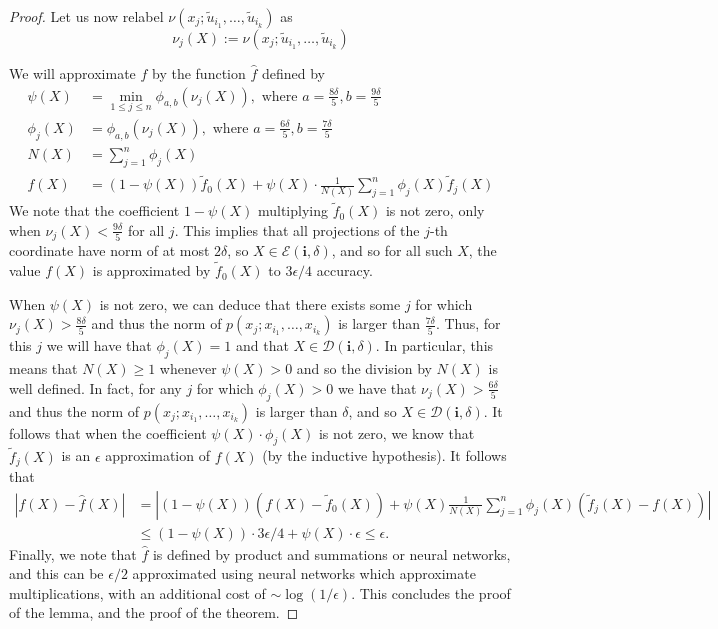 \documentclass[twoside,11pt]{article}
\begin{document}
\begin{proof}
Let us now relabel $\nu(x_j;\tilde u_{i_1},\ldots,\tilde u_{i_k}) $ as 
$$\nu_j(X):=\nu(x_j;\tilde u_{i_1},\ldots,\tilde u_{i_k}) $$

We will approximate $f$ by the function $\hat f$ defined by 
\begin{align*}
\psi(X)&=\min_{1\leq j \leq n} \phi_{a,b}\left(\nu_j(X)\right) , \text{ where } a=\frac{8\delta}{5}, b=\frac{9\delta}{5} \\
\phi_j(X)&=\phi_{a,b}\left( \nu_j(X)\right) , \text{ where } a=\frac{6\delta}{5}, b=\frac{7\delta}{5} \\
N(X)&=\sum_{j=1}^n  \phi_j(X)\\
\hat f(X)&=(1-\psi(X))\tilde{f}_0(X)+\psi(X)\cdot \frac{1}{N(X)} \sum_{j=1}^n  \phi_j(X)\tilde{f}_j(X)
\end{align*}
We note that the coefficient $1-\psi(X) $ multiplying $\tilde f_0(X)$ is not zero, only when $\nu_j(X)<\frac{9\delta}{5} $ for all $j$.  This implies that all projections of the $j$-th coordinate have norm of at most $2\delta$, so $X\in \mathcal{E}(\mathbf{i},\delta)$, and so for all such $X$, the value $f(X)$ is approximated by $\tilde f_0(X)$ to $3\epsilon/4$ accuracy. 

When $\psi(X)$ is not zero, we can deduce that there exists some $j$ for which $\nu_j(X)>\frac{8\delta}{5}$ and thus the norm of  $p(x_j;x_{i_1},\ldots,x_{i_k})$ is larger than $\frac{7\delta}{5} $. Thus, for this $j$ we will have that $\phi_j(X)=1 $ and that $X\in \mathcal{D}(\mathbf{i},\delta) $. In particular, this means that $N(X)\geq 1 $ whenever $\psi(X)>0$ and so the division by $N(X)$ is well defined. In fact, for any $j$ for which $\phi_j(X)>0$ we have that $\nu_j(X)>\frac{6\delta}{5}$ and thus the norm of  $p(x_j;x_{i_1},\ldots,x_{i_k})$ is larger than $\delta $, and so $X\in \mathcal{D}(\mathbf{i},\delta) $. It follows that when the coefficient $\psi(X)\cdot \phi_j(X) $ is not zero, we know that  $\tilde f_j(X)$ is an $\epsilon$ approximation of $f(X)$ (by the inductive hypothesis). It follows that
\begin{align*}
|f(X)-\hat f(X)|&=|(1-\psi(X))(f(X)-\tilde f_0(X))+\psi(X) \frac{1}{N(X)}\sum_{j=1}^n \phi_j(X)(\tilde f_j(X)-f(X))| \\
&\leq (1-\psi(X))\cdot 3\epsilon/4+\psi(X)\cdot\epsilon\leq \epsilon.
\end{align*}
Finally, we note that $\hat f$ is defined by product and summations or neural networks, and this can be $\epsilon/2$ approximated using neural networks which approximate multiplications, with an additional cost of $\sim \log(1/\epsilon)$. This concludes the proof of the lemma, and the proof of the theorem.
\end{proof}
\end{document}
